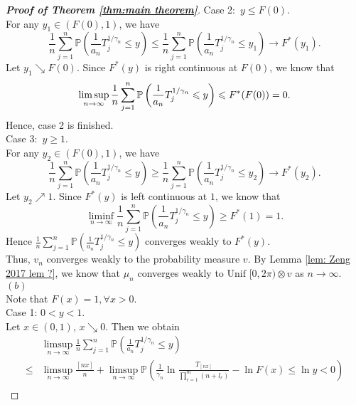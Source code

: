 \documentclass[12pt]{article}
\theoremstyle{plain}
\theoremstyle{definition}
\theoremstyle{remark}
\begin{document}
\begin{proof}[\textit{\textbf{Proof of Theorem \ref{thm:main theorem}}}]
Case 2:\ $y\leq F(0)$.\\
For any $y_1 \in (F(0),1)$, we have
\begin{equation*}
\frac{1}{n} \sum_{j=1}^{n} \mathbb{P}\left(\frac{1}{a_{n}} T_{j}^{1 / \gamma_{n}} \leqslant y\right)\leq \frac{1}{n} \sum_{j=1}^{n} \mathbb{P}\left(\frac{1}{a_{n}} T_{j}^{1 / \gamma_{n}} \leqslant y_1\right)\to F^*(y_1).
\end{equation*}
Let $y_1\searrow  F(0)$. Since $F^*(y)$ is right continuous at $F(0)$, we know that
\begin{equation*}
\limsup_{n\rightarrow \infty}\frac{1}{n} \sum_{j=1}^{n} \mathbb{P}\left(\frac{1}{a_{n}} T_{j}^{1 / \gamma_{n}} \leqslant y\right)\leq F^*(F(0))=0.\\
\end{equation*}
Hence, case 2 is finished.\\
Case 3:\ $y\geq 1$.\\
For any $y_2 \in (F(0),1)$, we have
\begin{equation*}
    \frac{1}{n} \sum_{j=1}^{n} \mathbb{P}\left(\frac{1}{a_{n}} T_{j}^{1 / \gamma_{n}} \leqslant y\right)\geq \frac{1}{n} \sum_{j=1}^{n} \mathbb{P}\left(\frac{1}{a_{n}} T_{j}^{1 / \gamma_{n}} \leqslant y_2\right)\to F^*(y_2).
\end{equation*}
Let $y_2\nearrow  1$. Since $F^*(y)$ is left continuous at $1$, we know that
\begin{equation*}
    \liminf_{n\rightarrow\infty}\frac{1}{n} \sum_{j=1}^{n} \mathbb{P}\left(\frac{1}{a_{n}} T_{j}^{1 / \gamma_{n}} \leqslant y\right)\geq F^*(1)=1.
\end{equation*}
Hence $\frac{1}{n} \sum_{j=1}^{n} \mathbb{P}\left(\frac{1}{a_{n}} T_{j}^{1 / \gamma_{n}} \leq y\right)$ converges weakly to $F^*(y)$.\\
Thus, $v_{n}$ converges weakly to the probability measure $v$.
By Lemma \ref{lem: Zeng 2017   lem ?}, we know that $\mu_{n}$ converges weakly to$\text { Unif }[0,2 \pi) \otimes v$ as $n\to \infty$.\\
$(b)$\\
Note that $F(x)=1,\forall x>0$.\\
Case 1: $0<y<1$.\\
Let $x\in (0,1)$, $x\searrow0$. Then we obtain
\begin{equation*}
\begin{aligned} & \limsup _{n \rightarrow \infty} \frac{1}{n} \sum_{j=1}^{n} \mathbb{P}\left(\frac{1}{a_{n}} T_{j}^{1 / \gamma_{n}} \leqslant y\right) \\ \leqslant & \limsup _{n \rightarrow \infty} \frac{[n x]}{n}+\limsup _{n \rightarrow \infty} \mathbb{P}\left(\frac{1}{\gamma_{n}} \ln \frac{T_{[n x]}}{\prod_{r=1}^{m}\left(n+l_{r}\right)}-\ln F(x) \leqslant \ln y<0\right) \\

\end{aligned}
\end{equation*}
\end{proof}
\end{document}
